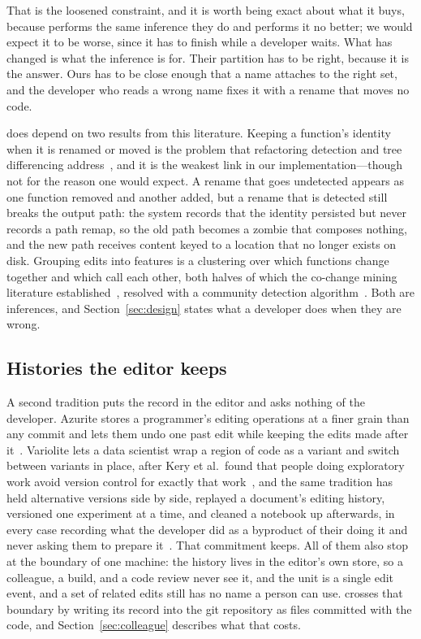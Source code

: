 That is the loosened constraint, and it is worth being exact about what it buys,
because \sgt{} performs the same inference they do and performs it no better; we
would expect it to be worse, since it has to finish while a developer waits. What
has changed is what the inference is for. Their partition has to be right, because
it is the answer. Ours has to be close enough that a name attaches to the right
set, and the developer who reads a wrong name fixes it with a rename that moves no
code.

\sgt{} does depend on two results from this literature. Keeping a function's
identity when it is renamed or moved is the problem that refactoring detection and
tree differencing address~\cite{tsantalis2018,falleri2014,fluri2007}, and it is
the weakest link in our implementation---though not for the reason one would
expect. A rename that goes undetected appears as one function removed and another
added, but a rename that is detected still breaks the output path: the system
records that the identity persisted but never records a path remap, so the old
path becomes a zombie that composes nothing, and the new path receives content
keyed to a location that no longer exists on disk. Grouping edits into features is a
clustering over which functions change together and which call each other, both
halves of which the co-change mining literature
established~\cite{zimmermann2004,ying2004,kim2005,godfrey2005}, resolved with a
community detection algorithm~\cite{traag2019,traag2011}. Both are inferences, and
Section~\ref{sec:design} states what a developer does when they are wrong.

\subsection{Histories the editor keeps}

A second tradition puts the record in the editor and asks nothing of the
developer. Azurite stores a programmer's editing operations at a finer grain than
any commit and lets them undo one past edit while keeping the edits made after
it~\cite{yoon2015,yoon2013,yoon2014}. Variolite lets a data
scientist wrap a region of code as a variant and switch between variants in place,
after Kery et al.\ found that people doing exploratory work avoid version
control for exactly that work~\cite{kery2017}, and the same tradition has held
alternative versions side by side, replayed a document's editing history, versioned
one experiment at a time, and cleaned a notebook up afterwards, in every case
recording what the developer did as a byproduct of their doing it and never asking
them to prepare
it~\cite{hartmann2008,terry2004,grossman2010,mikami2017,kery2018,head2019}. That
commitment \sgt{} keeps. All of them also stop at
the boundary of one machine: the history lives in the editor's own store, so a
colleague, a build, and a code review never see it, and the unit is a single edit
event, and a set of related edits still has no name a person can use. \sgt{}
crosses that boundary by writing its record into the git repository as files
committed with the code, and Section~\ref{sec:colleague} describes what that
costs.


